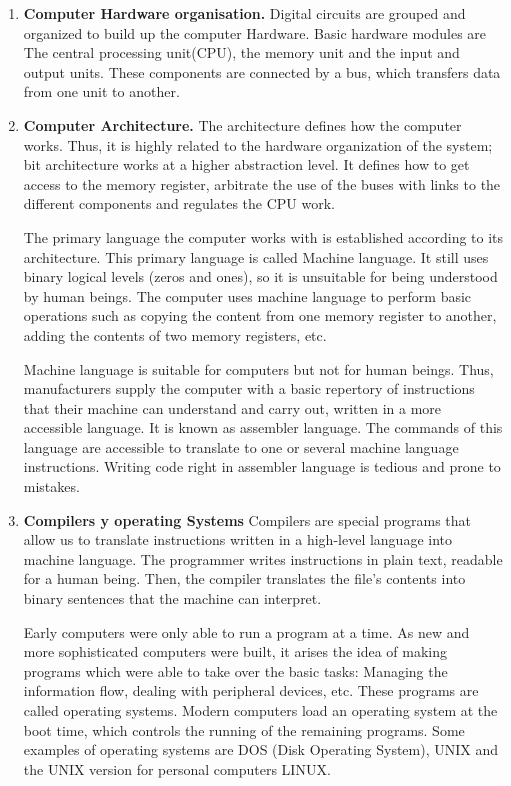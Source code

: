 \begin{paracol}{2}
\begin{enumerate}
\item \textbf{Computer Hardware organisation.} 
Digital circuits are grouped and organized to build up the computer Hardware. Basic hardware modules are The central processing unit(CPU), the memory unit and the input and output units. These components are connected by a bus, which transfers data from one unit to another.

\item \textbf{Computer Architecture.} 
The architecture defines how the computer works. Thus, it is highly related to the hardware organization of the system; bit architecture works at a higher abstraction level. It defines how to get access to the memory register, arbitrate the use of the buses with links to the different components and regulates the CPU work.   
 
The primary language the computer works with is established according to its architecture. This primary language is called Machine language. It still uses binary logical levels (zeros and ones), so it is unsuitable for being understood by human beings. The computer uses machine language to perform basic operations such as copying the content from one memory register to another, adding the contents of two memory registers, etc.     

Machine language is suitable for computers but not for human beings. Thus, manufacturers supply the computer with a basic repertory of instructions that their machine can understand and carry out, written in a more accessible language. It is known as assembler language. The commands of this language are accessible to translate to one or several machine language instructions. Writing code right in assembler language is tedious and prone to mistakes.     
   
\item \textbf{Compilers y operating Systems}  
Compilers are special programs that allow us to translate instructions written in a high-level language into machine language. The programmer writes instructions in plain text, readable for a human being. Then, the compiler translates the file's contents into binary sentences that the machine can interpret.
       
Early computers were only able to run a program at a time. As new and more sophisticated computers were built, it arises the idea of making programs which were able to take over the basic tasks:
Managing the information flow, dealing with peripheral devices, etc. These programs are called operating systems. Modern computers load an operating system at the boot time, which controls the running of the remaining programs. Some examples of operating systems are DOS (Disk Operating System), UNIX and the UNIX version for personal computers LINUX.       


\end{enumerate}
\end{paracol}
